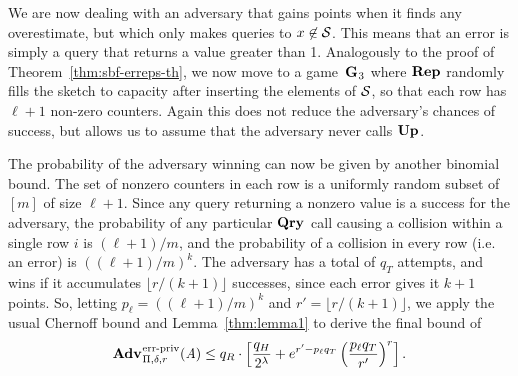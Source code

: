 We are now dealing with an adversary that gains points when it finds any
overestimate, but which only makes queries to $x\not\in\mathcal{S}$. This means that an
error is simply a query that returns a value greater than 1.
Analogously to the proof of Theorem~\ref{thm:sbf-erreps-th}, we now move to a
game~$\textup{\textbf{G}}\hspace{0.5pt}_3$ where $\textup{\textbf{Rep}}\hspace{0.5pt}$ randomly fills the sketch to capacity after
inserting the elements of $\mathcal{S}$, so that each row has $\ell+1$ non-zero
counters. Again this does not reduce the adversary's chances of success, but
allows us to assume that the adversary never calls $\textup{\textbf{Up}}\hspace{0.5pt}$.

The probability of the adversary winning can now be given by another binomial bound. The
set of nonzero counters in each row is a uniformly random subset of $[m]$ of
size $\ell+1$. Since any query returning a nonzero value is a success for the
adversary, the probability of any particular $\textup{\textbf{Qry}}\hspace{0.5pt}$ call causing a
collision within a single row $i$ is $(\ell+1)/m$, and the probability of a
collision in every row (i.e. an error) is $((\ell+1)/m)^k$. The adversary has a
total of $q_T$ attempts, and wins if it accumulates $\lfloor r/(k+1) \rfloor$
successes, since each error gives it $k+1$ points. So, letting
$p_\ell = ((\ell+1)/m)^k$ and $r' = \lfloor r/(k+1) \rfloor$, we apply the usual
Chernoff bound and Lemma~\ref{thm:lemma1} to derive the final bound of
\begin{equation}
   \Adv{\erreps}_{\Pi,\delta,r}(\advA) \leq
     q_R \cdot \left[\frac{q_H}{2^\lambda} + e^{r'-p_\ell q_T}\left(\frac{p_\ell q_T}{r'}\right)^r\right].
\end{equation}
